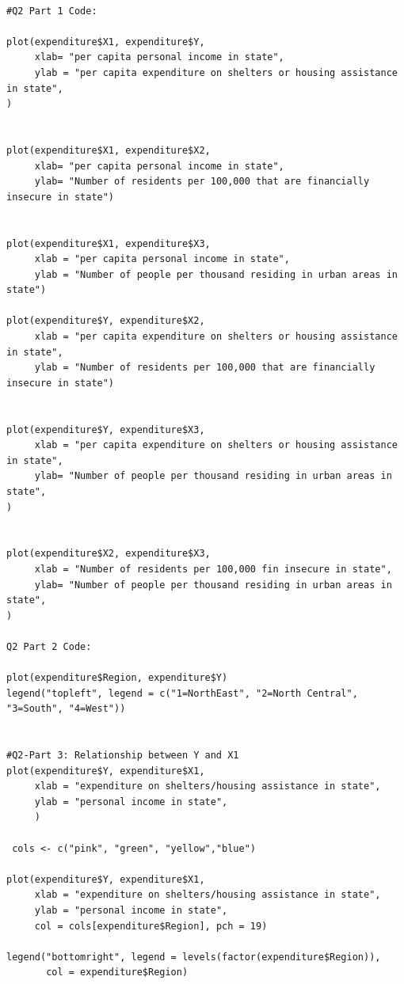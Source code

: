 \documentclass[12pt,letterpaper]{article}
\begin{document}
\begin{verbatim}

#Q2 Part 1 Code:

plot(expenditure$X1, expenditure$Y,
     xlab= "per capita personal income in state",
     ylab = "per capita expenditure on shelters or housing assistance in state",
)


plot(expenditure$X1, expenditure$X2,
     xlab= "per capita personal income in state",
     ylab= "Number of residents per 100,000 that are financially insecure in state")


plot(expenditure$X1, expenditure$X3,
     xlab = "per capita personal income in state",
     ylab = "Number of people per thousand residing in urban areas in state")

plot(expenditure$Y, expenditure$X2,
     xlab = "per capita expenditure on shelters or housing assistance in state",
     ylab = "Number of residents per 100,000 that are financially insecure in state")


plot(expenditure$Y, expenditure$X3,
     xlab = "per capita expenditure on shelters or housing assistance in state",
     ylab= "Number of people per thousand residing in urban areas in state",
)


plot(expenditure$X2, expenditure$X3,
     xlab = "Number of residents per 100,000 fin insecure in state",
     ylab= "Number of people per thousand residing in urban areas in state",
)

Q2 Part 2 Code:

plot(expenditure$Region, expenditure$Y)
legend("topleft", legend = c("1=NorthEast", "2=North Central", "3=South", "4=West"))


#Q2-Part 3: Relationship between Y and X1
plot(expenditure$Y, expenditure$X1,
     xlab = "expenditure on shelters/housing assistance in state",
     ylab = "personal income in state",
     )

 cols <- c("pink", "green", "yellow","blue")

plot(expenditure$Y, expenditure$X1,
     xlab = "expenditure on shelters/housing assistance in state",
     ylab = "personal income in state",
     col = cols[expenditure$Region], pch = 19)

legend("bottomright", legend = levels(factor(expenditure$Region)), 
       col = expenditure$Region)
       
\end{verbatim}
\vspace{.5cm}
\end{document}
